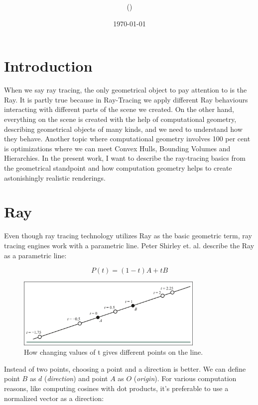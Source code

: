 \documentclass[12pt,a4paper,english]{article}
\title{\mySubject\\\myTitle}
\author{\myName (\myEmail)}
\date{\today}
\begin{document}


\section{Introduction}

When we say ray tracing, the only geometrical object to pay attention to is the Ray. It is partly true because in Ray-Tracing we apply different Ray behaviours interacting with different parts of the scene we created. On the other hand, everything on the scene is created with the help of computational geometry, describing geometrical objects of many kinds, and we need to understand how they behave. Another topic where computational geometry involves 100 per cent is optimizations where we can meet Convex Hulls, Bounding Volumes and Hierarchies. In the present work, I want to describe the ray-tracing basics from the geometrical standpoint and how computation geometry helps to create astonishingly realistic renderings.

\section{Ray}

Even though ray tracing technology utilizes Ray as the basic geometric term, ray tracing engines work with a parametric line. Peter Shirley et. al. describe \cite{Haines_Akenine-Möller_2019} the Ray as a parametric line:

\begin{equation}
    P(t) = (1 - t) A + t B
\end{equation}

\begin{figure}[H]
    \centering
    \includegraphics[width=0.8\textwidth]{parametric_line_gems}
    \caption[]{How changing values of t gives different points on the line.}
    \label{fig:parametric_line_gems}
\end{figure}

Instead of two points, choosing a point and a direction is better. We can define point \textbf{$B$} as \textbf{$d$} (\textit{direction}) and point \textbf{$A$} as \textbf{$O$} (\textit{origin}). For various computation reasons, like computing cosines with dot products, it's preferable to use a normalized vector as a direction:
\end{document}

